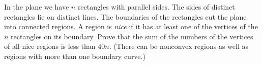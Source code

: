 In the plane we have $n$ rectangles with parallel sides. The sides of distinct rectangles lie on distinct lines. The boundaries of the rectangles cut the plane into connected regions. A region is \emph{nice} if it has at least one of the vertices of the $n$ rectangles on its boundary. Prove that the sum of the numbers of the vertices of all nice regions is less than $40n$. (There can be nonconvex regions as well as regions with more than one boundary curve.)
